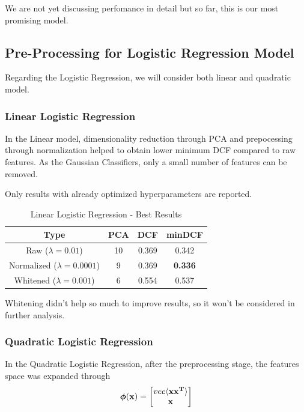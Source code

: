 \documentclass[12pt, twocolumn]{article}
\begin{document}
We are not yet discussing perfomance in detail but so far, this is our most promising model.

\subsection{Pre-Processing for Logistic Regression Model}

Regarding the Logistic Regression, we will consider both linear and quadratic model.

\subsubsection{Linear Logistic Regression}

In the Linear model, dimensionality reduction through PCA and prepocessing through normalization
helped to obtain lower minimum DCF compared to raw features. As the Gaussian Classifiers, only a small number
of features can be removed.

Only results with already optimized hyperparameters are reported.
\begin{table}[H]
    \centering
    \tiny
        \begin{tabular}{||c|c|c|c||}
            \hline
            Type & PCA & DCF & minDCF \\
            \hline
            \hline
            Raw ($\lambda = 0.01$) & 10 & 0.369 &  0.342  \\
            Normalized ($\lambda = 0.0001$) & 9 & 0.369 &  {\bf 0.336}  \\
            Whitened ($\lambda = 0.001$) & 6 & 0.554 &  0.537  \\
            \hline
    \end{tabular}
    \caption{Linear Logistic Regression - Best Results}
\end{table}

Whitening didn't help so much to improve results, so it won't be considered in further analysis.
\subsubsection{Quadratic Logistic Regression}

In the Quadratic Logistic Regression, after the preprocessing stage, the features space
was expanded through 
$$ {\bf \boldsymbol{\phi}(x)} = {
    \begin{bmatrix}
    vec\langle{\bf xx^T}\rangle\\
    {\bf x}
    \end{bmatrix}}
$$ 
\end{document}
